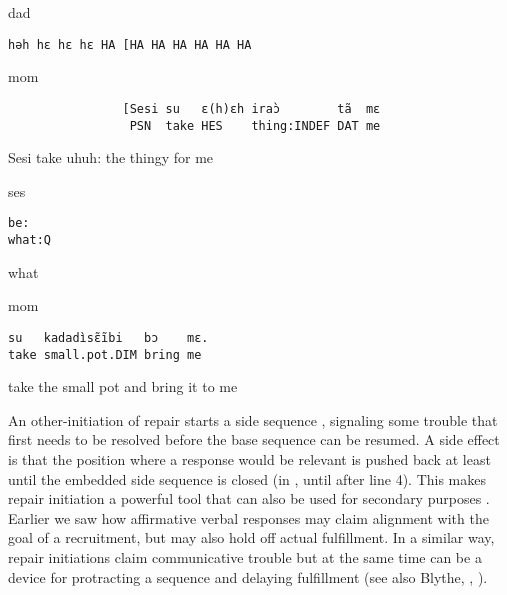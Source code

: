 \documentclass[output=paper]{langsci/langscibook}
\begin{document}
\vspace{2mm}
%
\begin{transbox}{1}{dad}
\begin{verbatim}
həh hɛ hɛ hɛ HA [HA HA HA HA HA HA
\end{verbatim}
\end{transbox}
%
\begin{mdframednoverticalspace}[style=firstfoc]
\begin{transbox}{2}{mom}
\begin{verbatim}
                [Sesi su   ɛ(h)ɛh iraɔ̀        tã  mɛ
                 PSN  take HES    thing:INDEF DAT me
\end{verbatim}
\hspace{2.5cm} Sesi take uhuh: the thingy for me
\end{transbox}
\end{mdframednoverticalspace}
%
\begin{transbox}{3}{ses}
\begin{verbatim}
be:
what:Q
\end{verbatim}
what
\end{transbox}
%
\begin{transbox}{4}{mom}
\begin{verbatim}
su   kadadìsɛ̃ĩbi   bɔ    mɛ.
take small.pot.DIM bring me
\end{verbatim}
take the small pot and bring it to me
\end{transbox}
%
\begin{mdframednoverticalspace}[style=secondfoc]
\end{mdframednoverticalspace}

\normalsize
An other-initiation of repair starts a side sequence \citep{jefferson_side_1972}, signaling some trouble that first needs to be resolved before the base sequence can be resumed. A side effect is that the position where a response would be relevant is pushed back at least until the embedded side sequence is closed (in , until after line 4). This makes repair initiation a powerful tool that can also be used for secondary purposes \citep{Sacks1992,schegloff_relevance_1979}. Earlier we saw how affirmative verbal responses may claim alignment with the goal of a recruitment, but may also hold off actual fulfillment. In a similar way, repair initiations claim communicative trouble but at the same time can be a device for protracting a sequence and delaying fulfillment (see also Blythe, , ).
\end{document}
